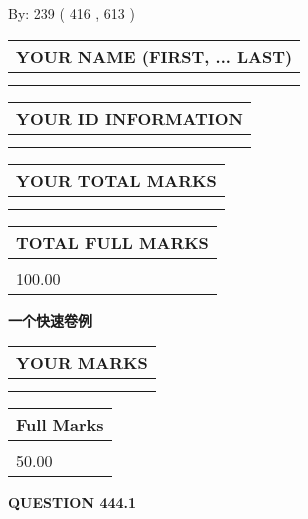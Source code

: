 \documentclass{ctexart}
\begin{document}
   
\hspace{1.0in} By: 
 239 ( 416 ,  613 )
   
   
   
   
\newpage 
\setcounter{page}{ 
   444001 } 
   
   
   
   
\noindent\begin{tabular}{|l|}
\hline
YOUR NAME (FIRST, ... LAST)  \\
\hline
 \\ 
 \\ 
\hline
\end{tabular}
\hspace{0.05in} \begin{tabular}{|l|}
\hline
 YOUR   ID   INFORMATION  \\
\hline
 \\ 
 \\ 
\hline
\end{tabular}
   
   
\vspace{0.2in}\noindent\begin{tabular}{|l|}
\hline
YOUR TOTAL MARKS  \\
\hline
 \\ 
 \\ 
\hline
\end{tabular}
\hspace{0.05in} \begin{tabular}{|l|}
\hline
TOTAL FULL MARKS  \\
\hline
 \\ 
100.00 \\
\hline
\end{tabular}
   
   
 \vspace{0.2in}
{\LARGE {\textbf{ 一个快速卷例}}}
   
   
  
\vspace{0.2in}
  
\noindent\begin{tabular}{|l|}
\hline
 YOUR MARKS  \\
\hline
 \\ 
 \\ 
\hline
\end{tabular}
\hspace{0.05in} \begin{tabular}{|l|}
\hline
 Full Marks  \\
\hline
 \\ 
50.00 \\
\hline
\end{tabular}
{\textbf{\Large{QUESTION
444.1 
}}}
  
\end{document}
